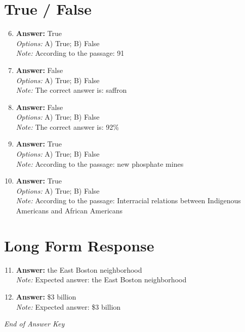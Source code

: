 \documentclass[12pt]{article}
\begin{document}
\section*{True / False}
\begin{enumerate}[label=\arabic*.]
\setcounter{enumi}{5}
\item \textbf{Answer:} True
\\ \textit{Options:} A) True; B) False
\\ \textit{Note:} According to the passage: 91
\item \textbf{Answer:} False
\\ \textit{Options:} A) True; B) False
\\ \textit{Note:} The correct answer is: saffron
\item \textbf{Answer:} False
\\ \textit{Options:} A) True; B) False
\\ \textit{Note:} The correct answer is: 92\%
\item \textbf{Answer:} True
\\ \textit{Options:} A) True; B) False
\\ \textit{Note:} According to the passage: new phosphate mines
\item \textbf{Answer:} True
\\ \textit{Options:} A) True; B) False
\\ \textit{Note:} According to the passage: Interracial relations between Indigenous Americans and African Americans
\end{enumerate}

\section*{Long Form Response}
\begin{enumerate}[label=\arabic*.]
\setcounter{enumi}{10}
\item \textbf{Answer:} the East Boston neighborhood
\\ \textit{Note:} Expected answer: the East Boston neighborhood
\item \textbf{Answer:} \$3 billion
\\ \textit{Note:} Expected answer: \$3 billion
\end{enumerate}

\vfill
\noindent\textit{End of Answer Key}
\end{document}
